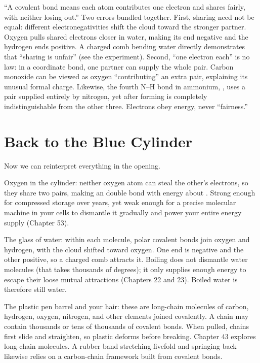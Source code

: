 \begin{wuqu}
``A covalent bond means each atom contributes one electron and shares fairly, with neither losing out.'' Two errors bundled together. First, sharing need not be equal: different electronegativities shift the cloud toward the stronger partner. Oxygen pulls shared electrons closer in water, making its end negative and the hydrogen ends positive. A charged comb bending water directly demonstrates that ``sharing is unfair'' (see the experiment). Second, ``one electron each'' is no law: in a coordinate bond, one partner can supply the whole pair. Carbon monoxide can be viewed as oxygen ``contributing'' an extra pair, explaining its unusual formal charge. Likewise, the fourth N--H bond in ammonium, , uses a pair supplied entirely by nitrogen, yet after forming is completely indistinguishable from the other three. Electrons obey energy, never ``fairness.''
\end{wuqu}

\section{Back to the Blue Cylinder}

Now we can reinterpret everything in the opening.

Oxygen in the cylinder: neither oxygen atom can steal the other's electrons, so they share two pairs, making an  double bond with energy about . Strong enough for compressed storage over years, yet weak enough for a precise molecular machine in your cells to dismantle it gradually and power your entire energy supply (Chapter 53).

The glass of water: within each molecule, polar covalent bonds join oxygen and hydrogen, with the cloud shifted toward oxygen. One end is negative and the other positive, so a charged comb attracts it. Boiling does not dismantle water molecules (that takes thousands of degrees); it only supplies enough energy to escape their loose mutual attractions (Chapters 22 and 23). Boiled water is therefore still water.

The plastic pen barrel and your hair: these are long-chain molecules of carbon, hydrogen, oxygen, nitrogen, and other elements joined covalently. A chain may contain thousands or tens of thousands of covalent bonds. When pulled, chains first slide and straighten, so plastic deforms before breaking. Chapter 43 explores long-chain molecules. A rubber band stretching fivefold and springing back likewise relies on a carbon-chain framework built from covalent bonds.

